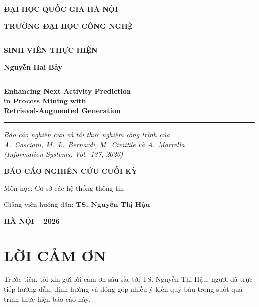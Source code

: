 \documentclass[a4paper,12pt,oneside]{report}
\newcommand{\reporttitlelines}{Enhancing Next Activity Prediction\\in Process Mining with\\Retrieval-Augmented Generation}
\newcommand{\reportsubtitle}{Báo cáo nghiên cứu và tái thực nghiệm công trình của\\A.~Casciani, M.~L.~Bernardi, M.~Cimitile và A.~Marrella\\(\textit{Information Systems}, Vol.~137, 2026)}
\newcommand{\studentname}{Nguyễn Hai Bảy}
\newcommand{\supervisor}{TS. Nguyễn Thị Hậu}
\newcommand{\coursename}{Cơ sở các hệ thống thông tin}
\begin{document}
\begin{titlepage}
\coverframe
\centering
{}
\vspace*{0.2cm}
{\large\bfseries ĐẠI HỌC QUỐC GIA HÀ NỘI\par}
{\large\bfseries TRƯỜNG ĐẠI HỌC CÔNG NGHỆ\par}
\vspace{0.15cm}
{\color{accent}\rule{5cm}{0.6pt}\par}
\vspace{2.2cm}
{\normalsize\bfseries SINH VIÊN THỰC HIỆN\par}
\vspace{0.3cm}
{\Large\bfseries \studentname\par}
\vspace{2.2cm}
{\color{accent}\rule{\linewidth}{0.9pt}\par}
\vspace{0.45cm}
{\huge\bfseries{}\reporttitlelines\par}
\vspace{0.4cm}
{\color{accent}\rule{\linewidth}{0.9pt}\par}
\vspace{0.6cm}
{\normalsize\itshape{}\reportsubtitle\par}
\vspace{1.6cm}
{\normalsize\bfseries BÁO CÁO NGHIÊN CỨU CUỐI KỲ\par}
{\normalsize Môn học: \coursename\par}
\vspace{1.2cm}
{\normalsize Giảng viên hướng dẫn: \textbf{\supervisor}\par}
\vfill
{\normalsize\bfseries HÀ NỘI -- 2026\par}
\vspace*{0.1cm}
\end{titlepage}

\setcounter{page}{1}

\chapter*{LỜI CẢM ƠN}

Trước tiên, tôi xin gửi lời cảm ơn sâu sắc tới \supervisor, người đã trực tiếp hướng dẫn, định hướng và đóng góp nhiều ý kiến quý báu trong suốt quá trình thực hiện báo cáo này.
\end{document}
